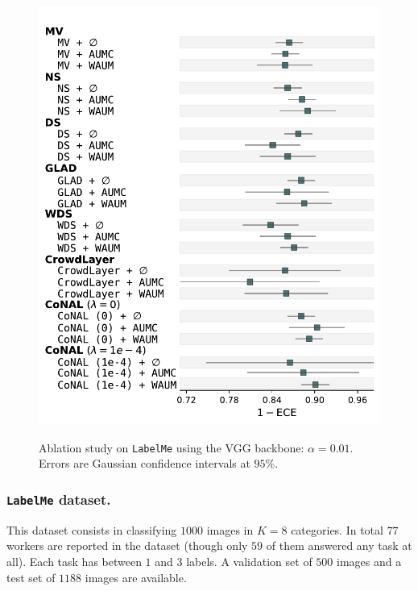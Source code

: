\begin{figure}[th]
\begin{minipage}{0.45\textwidth}
        \includegraphics[width=\linewidth]{images/ECE_foresplot_labelme.pdf}
        \label{fig:forest_labelme_ece}
    \end{minipage}
    \caption{Ablation study on \texttt{LabelMe} using the VGG backbone: $\alpha=0.01$. Errors are Gaussian confidence intervals at $95\%$.}
    \label{fig:forest_labelme}
\end{figure}

\subsubsection{\texttt{LabelMe} dataset.} This dataset consists in classifying $1000$ images in $K=8$ categories.
In total $77$ workers are reported in the dataset (though only $59$ of them answered any task at all).
Each task has between $1$ and $3$ labels. A validation set of $500$ images and a test set of $1188$ images are available.

